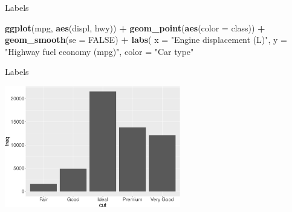 \documentclass[ignorenonframetext,]{beamer}
\newenvironment{Shaded}{\begin{snugshade}}{\end{snugshade}}
\newcommand{\DataTypeTok}[1]{\textcolor[rgb]{0.13,0.29,0.53}{#1}}
\newcommand{\KeywordTok}[1]{\textcolor[rgb]{0.13,0.29,0.53}{\textbf{#1}}}
\newcommand{\NormalTok}[1]{#1}
\newcommand{\OperatorTok}[1]{\textcolor[rgb]{0.81,0.36,0.00}{\textbf{#1}}}
\newcommand{\OtherTok}[1]{\textcolor[rgb]{0.56,0.35,0.01}{#1}}
\newcommand{\StringTok}[1]{\textcolor[rgb]{0.31,0.60,0.02}{#1}}
\begin{document}
\begin{frame}[fragile]{Labels}
\protect\hypertarget{labels-5}{}

\begin{Shaded}
\begin{Highlighting}[]
\KeywordTok{ggplot}\NormalTok{(mpg, }\KeywordTok{aes}\NormalTok{(displ, hwy)) }\OperatorTok{+}
\StringTok{  }\KeywordTok{geom_point}\NormalTok{(}\KeywordTok{aes}\NormalTok{(}\DataTypeTok{color =}\NormalTok{ class)) }\OperatorTok{+}
\StringTok{  }\KeywordTok{geom_smooth}\NormalTok{(}\DataTypeTok{se =} \OtherTok{FALSE}\NormalTok{) }\OperatorTok{+}
\StringTok{  }\KeywordTok{labs}\NormalTok{(}
    \DataTypeTok{x =} \StringTok{"Engine displacement (L)"}\NormalTok{,}
    \DataTypeTok{y =} \StringTok{"Highway fuel economy (mpg)"}\NormalTok{,}
    \DataTypeTok{color =} \StringTok{"Car type"}
\end{Highlighting}
\end{Shaded}

\end{frame}

\begin{frame}{Labels}
\protect\hypertarget{labels-6}{}

\begin{center}\includegraphics[height=200px]{data-visualization_files/figure-beamer/unnamed-chunk-117-1} \end{center}

\end{frame}
\end{document}
